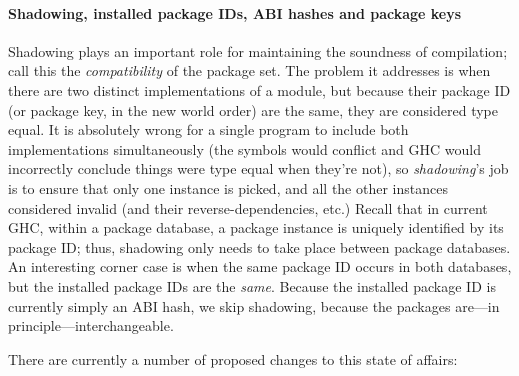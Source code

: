 \documentclass{article}
\begin{document}
\paragraph{Shadowing, installed package IDs, ABI hashes and package
keys} Shadowing plays an important role for maintaining the soundness of
compilation; call this the \emph{compatibility} of the package set.  The
problem it addresses is when there are two distinct implementations of a
module, but because their package ID (or package key, in the new world
order) are the same, they are considered type equal.  It is absolutely
wrong for a single program to include both implementations
simultaneously (the symbols would conflict and GHC would incorrectly
conclude things were type equal when they're not), so \emph{shadowing}'s
job is to ensure that only one instance is picked, and all the other
instances considered invalid (and their reverse-dependencies, etc.)
Recall that in current GHC, within a package database, a package
instance is uniquely identified by its package ID\@; thus, shadowing
only needs to take place between package databases.  An interesting
corner case is when the same package ID occurs in both databases, but
the installed package IDs are the \emph{same}.  Because the installed
package ID is currently simply an ABI hash, we skip shadowing, because
the packages are---in principle---interchangeable.

There are currently a number of proposed changes to this state of affairs:
\end{document}
